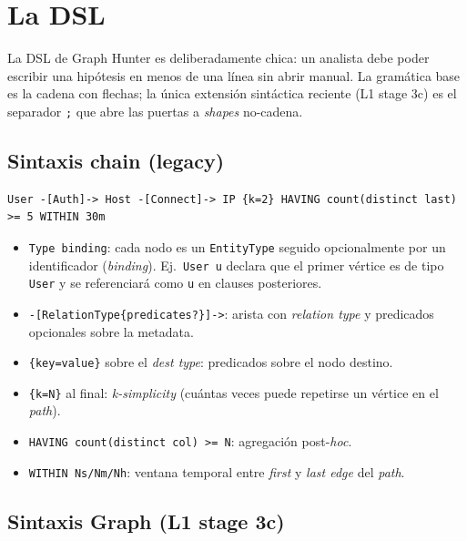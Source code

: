 \chapter{La DSL}
\label{cap:dsl}

\begin{intuicion}
La DSL de Graph Hunter es deliberadamente chica: un analista debe
poder escribir una hipótesis en menos de una línea sin abrir
manual. La gramática base es la cadena con flechas; la única
extensión sintáctica reciente (L1 stage 3c) es el separador
\texttt{;} que abre las puertas a \emph{shapes} no-cadena.
\end{intuicion}

\section{Sintaxis chain (legacy)}

\begin{lstlisting}
User -[Auth]-> Host -[Connect]-> IP {k=2} HAVING count(distinct last) >= 5 WITHIN 30m
\end{lstlisting}

\begin{itemize}
    \item \texttt{Type binding}: cada nodo es un \texttt{EntityType}
    seguido opcionalmente por un identificador (\emph{binding}). Ej.\
    \texttt{User u} declara que el primer vértice es de tipo
    \texttt{User} y se referenciará como \texttt{u} en clauses
    posteriores.
    \item \texttt{-[RelationType\{predicates?\}]->}: arista con
    \emph{relation type} y predicados opcionales sobre la metadata.
    \item \texttt{\{key=value\}} sobre el \emph{dest type}: predicados
    sobre el nodo destino.
    \item \texttt{\{k=N\}} al final: \emph{k-simplicity} (cuántas veces
    puede repetirse un vértice en el \emph{path}).
    \item \texttt{HAVING count(distinct col) >= N}: agregación
    post-\emph{hoc}.
    \item \texttt{WITHIN Ns/Nm/Nh}: ventana temporal entre \emph{first}
    y \emph{last edge} del \emph{path}.
\end{itemize}

\section{Sintaxis Graph (L1 stage 3c)}

